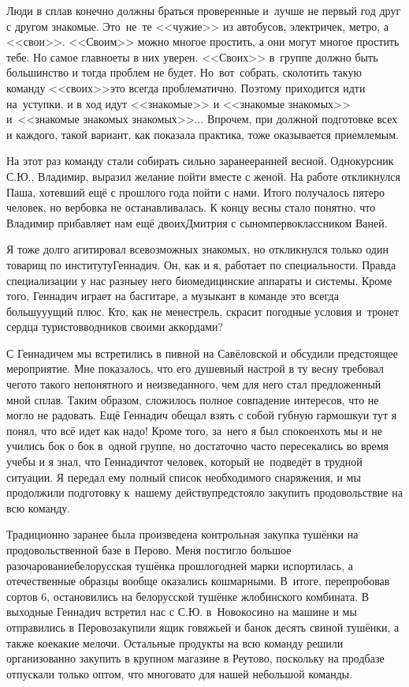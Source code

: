Люди в сплав конечно должны браться проверенные и~лучше не первый год друг с другом знакомые. Это~не~те <<чужие>> из автобусов, электричек, метро, а <<свои>>. <<Своим>> можно многое простить, а они могут многое простить тебе. Но самое главное\mdash ты в них уверен. <<Своих>> в~группе должно быть большинство и тогда проблем не будет. Но~вот~собрать, сколотить такую команду <<своих>>\mdash это всегда проблематично. Поэтому приходится идти на~уступки, и в ход идут <<знакомые>> и <<знакомые знакомых>> и~<<знакомые знакомых знакомых>>$\ldots$ Впрочем, при должной подготовке всех и каждого, такой вариант, как показала практика, тоже оказывается приемлемым.

На этот раз команду стали собирать сильно заранее\mdash ранней весной. Однокурсник С.Ю., Владимир, выразил желание пойти вместе с женой. На работе откликнулся Паша, хотевший ещё с прошлого года пойти с нами. Итого получалось пятеро человек, но вербовка не останавливалась. К концу весны стало понятно, что Владимир прибавляет нам ещё двоих\mdash Дмитрия с сыном\sdash первоклассником Ваней. 

Я тоже долго агитировал всевозможных знакомых, но откликнулся только один товарищ по институту\mdash Геннадич. Он, как и я, работает по специальности. Правда специализации у нас разные\mdash у него биомедицинские аппараты и системы. Кроме того, Геннадич играет на бас\sdash гитаре, а музыкант в команде это всегда большу\sdash у\sdash ущий плюс. Кто, как не менестрель, скрасит погодные условия и~тронет сердца туристов\sdash водников своими аккордами?

С Геннадичем мы встретились в пивной на Савёловской и обсудили предстоящее мероприятие. Мне показалось, что его душевный настрой в ту весну требовал чего\sdash то такого непонятного и неизведанного, чем для него стал предложенный мной сплав. Таким образом, сложилось полное совпадение интересов, что не могло не радовать. Ещё Геннадич обещал взять с собой губную гармошку\mdash и тут я понял, что всё идет как надо! Кроме того, за~него я был спокоен\mdash хоть мы и не учились бок о бок в~одной группе, но достаточно часто пересекались во время учебы и я знал, что Геннадич\mdash тот человек, который не~подведёт в трудной ситуации. Я передал ему полный список необходимого снаряжения, и мы продолжили подготовку к~нашему действу\mdash предстояло закупить продовольствие на всю команду.

Традиционно заранее была произведена контрольная закупка тушёнки на продовольственной базе в Перово. Меня постигло большое разочарование\mdash белорусская тушёнка прошлогодней марки испортилась, а отечественные образцы вообще оказались кошмарными. В~итоге, перепробовав сортов 6\thinspace\nbdash{}, остановились на белорусской тушёнке жлобинского комбината. В выходные Геннадич встретил нас с С.Ю. в~Новокосино на машине и мы отправились в Перово\mdash закупили ящик говяжьей и банок десять свиной тушёнки, а также кое\sdash какие мелочи. Остальные продукты на всю команду решили организованно закупить в крупном магазине в Реутово, поскольку на продбазе отпускали только оптом, что многовато для нашей небольшой команды.  

